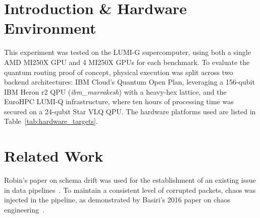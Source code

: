 \documentclass[journal]{IEEEtran}
\begin{document}
\section{Introduction \& Hardware Environment}
This experiment was tested on the LUMI-G supercomputer, using both a single AMD MI250X GPU and 4 MI250X GPUs for each benchmark. To evaluate the quantum routing proof of concept, physical execution was split across two backend architectures: IBM Cloud's Quantum Open Plan, leveraging a 156-qubit IBM Heron r2 QPU (\textit{ibm\_marrakesh}) with a heavy-hex lattice, and the EuroHPC LUMI-Q infrastructure, where ten hours of processing time was secured on a 24-qubit Star VLQ QPU.
The hardware platforms used are listed in Table~\ref{tab:hardware_targets}.

\begin{table}[htbp]
\centering
\caption{Hardware Execution \& Acceleration Targets.}
\label{tab:hardware_targets}
\end{table}

\section{Related Work}

Robin's paper on schema drift was used for the establishment of an existing issue in data pipelines~\cite{Robindrift}. 
To maintain a consistent level of corrupted packets, chaos was injected in the pipeline, as demonstrated by Basiri's 2016 paper on chaos engineering~\cite{Basiri_2016}.
\end{document}
